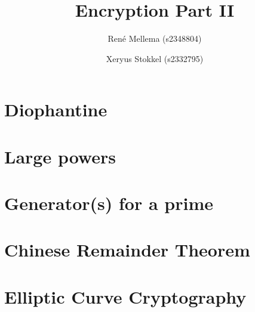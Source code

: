 \documentclass[a4paper, 10pt]{article}
\title{Encryption Part II}
\author{Ren\'e Mellema (s2348804) \and Xeryus Stokkel (s2332795)}
\date{} %
\begin{document}
\maketitle

\setcounter{section}{10}

\section{Diophantine}


\section{Large powers}


\section{Generator(s) for a prime}


\section{Chinese Remainder Theorem}


\section{Elliptic Curve Cryptography}

\end{document}
